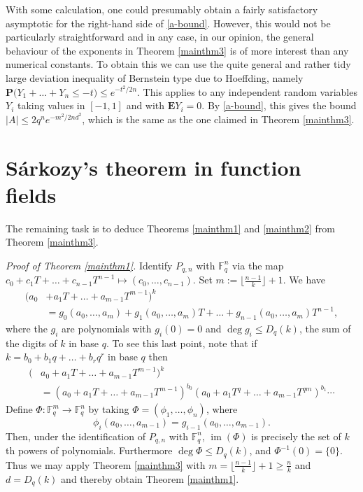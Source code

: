 \documentclass[12pt,reqno]{amsart}
\theoremstyle{definition}
\renewcommand{\leq}{\leqslant}
\renewcommand{\geq}{\geqslant}
\newcommand\im{\operatorname{im}}
\def\F{\mathbb{F}}
\def\E{\mathbf{E}}
\def\P{\mathbf{P}}
\numberwithin{equation}{section}
\begin{document}
With some calculation, one could presumably obtain a fairly satisfactory asymptotic for the right-hand side of \eqref{a-bound}. However, this would not be particularly straightforward and in any case, in our opinion, the general behaviour of the exponents in Theorem \ref{mainthm3} is of more interest than any numerical constants. To obtain this we can use the quite general and rather tidy large deviation inequality of Bernstein type due to Hoeffding, namely $\P \big( Y_1 + \dots + Y_n \leq - t) \leq e^{-t^2/2n}$. This applies to any independent random variables $Y_i$ taking values in $[-1,1]$ and with $\E Y_i = 0$. By \eqref{a-bound}, this gives the bound $|A| \leq 2 q^n e^{-m^2/2nd^2}$, which is the same as the one claimed in Theorem \ref{mainthm3}.

 

\section{S\'arkozy's theorem in function fields}

The remaining task is to deduce Theorems \ref{mainthm1} and \ref{mainthm2} from Theorem \ref{mainthm3}. 

\emph{Proof of Theorem \ref{mainthm1}.} Identify $P_{q,n}$ with $\F_q^n$ via the map $c_0 + c_1T + \dots + c_{n-1} T^{n-1} \mapsto (c_0, \dots, c_{n-1})$. Set $m := \lfloor \frac{n-1}{k}\rfloor + 1$. We have 
\begin{align*} (a_0 & + a_1 T + \dots + a_{m-1} T^{m-1})^k \\ & = g_0(a_0,\dots, a_m) + g_1(a_0,\dots, a_m) T + \dots + g_{n-1}(a_0,\dots, a_m) T^{n-1},\end{align*}
where the $g_i$ are polynomials with $g_i(0) = 0$ and $\deg g_i \leq D_q(k)$, the sum of the digits of $k$ in base $q$. To see this last point, note that if 
 $k = b_0 + b_1 q + \dots + b_r q^r$ in base $q$ then
 \begin{align*} (& a_0 + a_1 T + \dots + a_{m-1} T^{m-1})^k \\ &  = (a_0 + a_1 T + \dots + a_{m-1} T^{m-1})^{b_0} (a_0 + a_1 T^q + \dots + a_{m-1} T^{qm})^{b_1}  \cdots\end{align*}
Define $\Phi : \F_q^m \rightarrow \F_q^n$ by taking $\Phi = (\phi_1,\dots, \phi_n)$, where \[ \phi_i(a_0,\dots, a_{m-1}) = g_{i-1}(a_0,\dots, a_{m-1}).\] Then, under the identification of $P_{q,n}$ with $\F_q^n$, $\im (\Phi)$ is precisely the set of $k$th powers of polynomials. Furthermore $\deg \Phi \leq D_q(k)$, and $\Phi^{-1}(0) = \{0\}$. Thus we may apply Theorem \ref{mainthm3} with $m = \lfloor \frac{n-1}{k}\rfloor + 1 \geq \frac{n}{k}$ and $d = D_q(k)$ and thereby obtain Theorem \ref{mainthm1}.
\end{document}
